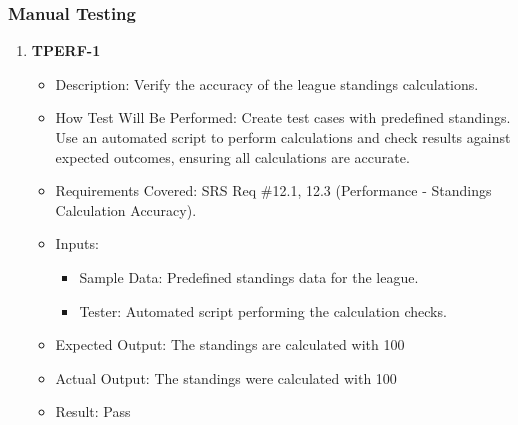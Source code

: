 \documentclass[12pt, titlepage]{article}
\begin{document}
\subsubsection{Manual Testing}
\begin{enumerate}
    \item \textbf{TPERF-1}  
        \begin{itemize}
            \item Description: Verify the accuracy of the league standings calculations.
            \item How Test Will Be Performed: Create test cases with predefined standings. Use an automated script to perform calculations and check results against expected outcomes, ensuring all calculations are accurate.
            \item Requirements Covered: SRS Req \#12.1, 12.3 (Performance - Standings Calculation Accuracy).
            \item Inputs:  
                \begin{itemize}
                    \item Sample Data: Predefined standings data for the league.
                    \item Tester: Automated script performing the calculation checks.
                \end{itemize}
            \item Expected Output: The standings are calculated with 100%
            \item Actual Output: The standings were calculated with 100%
            \item Result: Pass
        \end{itemize}


\end{enumerate}
\end{document}
